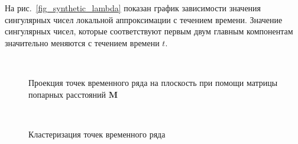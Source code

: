 \documentclass[12pt, twoside]{article}
\begin{document}
На рис.~\ref{fig_synthetic_lambda} показан график зависимости значения сингулярных чисел локальной аппроксимации с течением времени. Значение сингулярных чисел, которые соответствуют первым двум главным компонентам значительно меняются с течением времени $t$. 

\begin{figure}[h!t]\center
{}
\\
\caption{Проекция точек временного ряда на плоскость при помощи матрицы попарных расстояний $\textbf{M}$}
\label{fig_synthetic_2D}
\end{figure}


\begin{figure}[h!t]\center
{}
\\
\caption{Кластеризация точек временного ряда}
\label{fig_synthetic_claster}
\end{figure}
\end{document}
